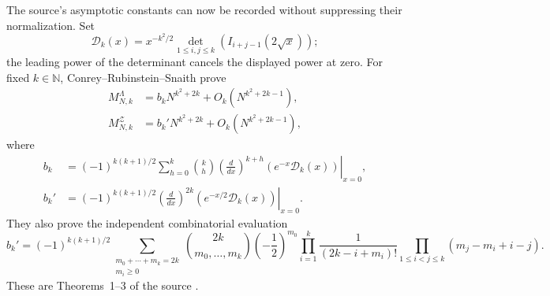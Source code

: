 The source's asymptotic constants can now be recorded without suppressing their
normalization.  Set
\[
 \mathcal D_k(x)=
 x^{-k^2/2}\det_{1\leq i,j\leq k}
 \left(I_{i+j-1}(2\sqrt{x})\right);
\]
the leading power of the determinant cancels the displayed power at zero.  For fixed
$k\in\mathbb N$, Conrey--Rubinstein--Snaith prove
\begin{align}
 M^\Lambda_{N,k}
 &=b_kN^{k^2+2k}+O_k(N^{k^2+2k-1}),
 \label{eq:crs-lambda-asymptotic}\\
 M^{\mathcal Z}_{N,k}
 &=b_k'N^{k^2+2k}+O_k(N^{k^2+2k-1}),
 \label{eq:crs-z-asymptotic}
\end{align}
where
\begin{align}
 b_k&=(-1)^{k(k+1)/2}
 \sum_{h=0}^{k}\binom{k}{h}
 \left.
 \left(\frac d{dx}\right)^{k+h}
 \left(e^{-x}\mathcal D_k(x)\right)
 \right|_{x=0},
 \label{eq:crs-bk-bessel}\\
 b_k'&=(-1)^{k(k+1)/2}
 \left.
 \left(\frac d{dx}\right)^{2k}
 \left(e^{-x/2}\mathcal D_k(x)\right)
 \right|_{x=0}.
 \label{eq:crs-bkprime-bessel}
\end{align}
They also prove the independent combinatorial evaluation
\begin{equation}
 b_k'=(-1)^{k(k+1)/2}
 \sum_{\substack{m_0+\cdots+m_k=2k\\m_i\geq0}}
 \binom{2k}{m_0,\ldots,m_k}
 \left(-\frac12\right)^{m_0}
 \prod_{i=1}^{k}\frac1{(2k-i+m_i)!}
 \prod_{1\leq i<j\leq k}(m_j-m_i+i-j).
 \label{eq:crs-bkprime-combinatorial}
\end{equation}
These are Theorems~1--3 of the source
\cite[Thms.~1--3]{conreyRubinsteinSnaith2006}.

